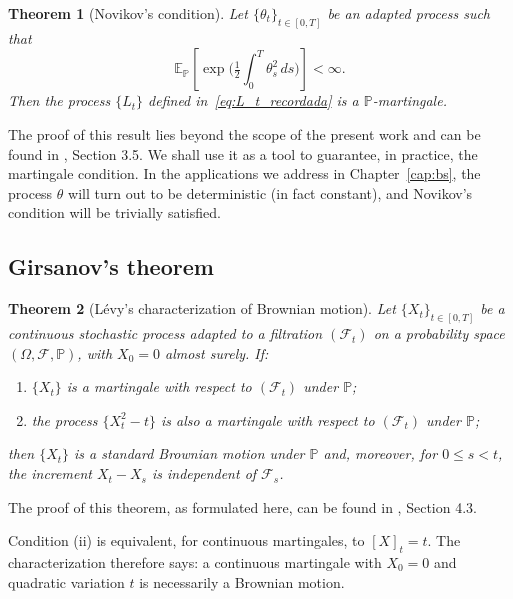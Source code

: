 \documentclass[11pt,a4paper,oneside]{report}
\theoremstyle{plain}
\newtheorem{teorema}{Theorem}[chapter]
\theoremstyle{definition}
\theoremstyle{remark}
\newcommand{\E}{\mathbb{E}}
\newcommand{\PP}{\mathbb{P}}
\newcommand{\F}{\mathcal{F}}
\newcommand{\1}{\mathbf{1}}
\begin{document}
\begin{teorema}[Novikov's condition]
\label{teo:novikov}
Let $\{\theta_t\}_{t \in [0, T]}$ be an adapted process such that
\begin{equation}\label{eq:novikov}
  \E_\PP\!\left[\exp\!\biggl(\tfrac{1}{2} \int_0^T \theta_s^2\, ds\biggr)\right]
  < \infty.
\end{equation}
Then the process $\{L_t\}$ defined in~\eqref{eq:L_t_recordada} is a
$\PP$-martingale.
\end{teorema}

The proof of this result lies beyond the scope of the present work
and can be found in \cite{karatzas-shreve}, Section 3.5. We shall use
it as a tool to guarantee, in practice, the martingale condition. In
the applications we address in Chapter~\ref{cap:bs}, the process
$\theta$ will turn out to be deterministic (in fact constant), and
Novikov's condition will be trivially satisfied.

\subsection{Girsanov's theorem}
\label{subsec:girsanov_teorema}

\begin{teorema}[Lévy's characterization of Brownian motion]
\label{teo:caracterizacion_levy}
Let $\{X_t\}_{t \in [0, T]}$ be a continuous stochastic process
adapted to a filtration $(\F_t)$ on a probability space
$(\Omega, \F, \PP)$, with $X_0 = 0$ almost surely. If:
\begin{enumerate}[label=\textnormal{(\roman*)}]
  \item $\{X_t\}$ is a martingale with respect to $(\F_t)$ under $\PP$;
  \item the process $\{X_t^2 - t\}$ is also a martingale with respect
        to $(\F_t)$ under $\PP$;
\end{enumerate}
then $\{X_t\}$ is a standard Brownian motion under $\PP$ and, moreover, for $0 \leq s < t$, the increment $X_t - X_s$ is independent of $\F_s$.
\end{teorema}

The proof of this theorem, as formulated here, can be found in
\cite{etheridge}, Section 4.3.

Condition (ii) is equivalent, for continuous martingales, to
$[X]_t = t$. The characterization therefore says: a continuous
martingale with $X_0 = 0$ and quadratic variation $t$ is necessarily
a Brownian motion.
\end{document}
